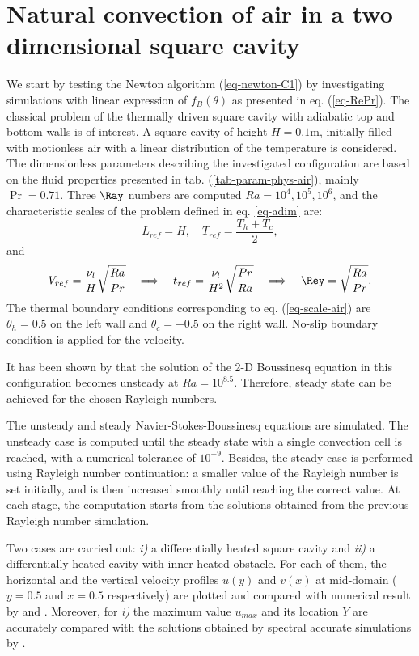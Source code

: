 \section{Natural convection of air in a two dimensional square cavity}\label{sec: natconv-air-2D}
We start by testing the Newton algorithm (\ref{eq-newton-C1}) by investigating simulations with linear expression of $f_B(\theta)$ as presented in eq. (\ref{eq-RePr}).
The classical problem of the thermally driven square cavity with adiabatic top and bottom walls is of interest.
A square cavity of height $H = 0.1$m, initially filled with motionless air with a linear distribution of the temperature is considered. 
The dimensionless parameters describing the investigated configuration are based on the fluid properties presented in tab. (\ref{tab-param-phys-air}), mainly $\Pr = 0.71$.
Three $\Ray$ numbers are computed $Ra = 10^4, 10^5, 10^6$, and
the characteristic scales of the problem defined in eq. \ref{eq-adim} are:
\begin{equation} \label{eq-scale-air}
	L_{ref} = H, \quad T_{ref} = \frac{T_h + T_c}{2},
\end{equation}
and
\begin{equation} \label{eq-scaling-3}
   V_{ref} = \frac{\nu_l}{H} \sqrt{\frac{Ra}{Pr}} 
   \quad \Longrightarrow \quad t_{ref} = \frac{\nu_l}{H^2} \sqrt{\frac{Pr}{Ra}} 
   \quad \Longrightarrow \quad \Rey = \sqrt{\frac{Ra}{Pr}}.
\end{equation} 
The thermal boundary conditions corresponding to eq. (\ref{eq-scale-air}) are $\theta_h = 0.5$ on the left wall and $\theta_c = -0.5$ on the right wall. 
No-slip boundary condition is applied for the velocity.

It has been shown by \cite{LeQuere91} that the solution of the 2-D Boussinesq equation in this configuration becomes unsteady at $Ra = 10^{8.5}$.
Therefore, steady state can be achieved for the chosen Rayleigh numbers.

The unsteady and steady Navier-Stokes-Boussinesq equations are simulated.
The unsteady case is computed until the steady state with a single convection cell is reached, with a numerical tolerance of $10^{-9}$.
Besides, the steady case is performed using Rayleigh number continuation:
a smaller value of the Rayleigh number is set initially, and is then increased smoothly until reaching the correct value.
At each stage, the computation starts from the solutions obtained from the previous Rayleigh number simulation.

Two cases are carried out: {\it i)} a differentially heated square cavity and {\it ii)} a differentially heated cavity with inner heated obstacle.
For each of them, the horizontal and the vertical velocity profiles $u(y)$ and $v(x)$ at mid-domain ($y=0.5$ and $x=0.5$ respectively) are plotted and compared with numerical result by \cite{LeQuere91} and \cite{Raluca2013}. 
Moreover, for {\it i)} the maximum value $u_{max}$ and its location $Y$ are accurately compared with the solutions obtained by spectral accurate simulations by \cite{LeQuere91}.

